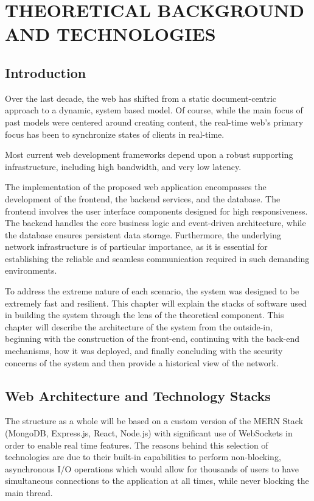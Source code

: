 \chapter{THEORETICAL BACKGROUND AND TECHNOLOGIES}

\section{Introduction}

Over the last decade, the web has shifted from a static document-centric approach to a dynamic, system based model. Of course, while the main focus of past models were centered around creating content, the real-time web's primary focus has been to synchronize states of clients in real-time. 

Most current web development frameworks depend upon a robust supporting infrastructure, including high bandwidth, and very low latency. 

The implementation of the proposed web application encompasses the development of the frontend, the backend services, and the database. The frontend involves the user interface components designed for high responsiveness. The backend handles the core business logic and event-driven architecture, while the database ensures persistent data storage. Furthermore, the underlying network infrastructure is of particular importance, as it is essential for establishing the reliable and seamless communication required in such demanding environments. 

To address the extreme nature of each scenario, the system was designed to be extremely fast and resilient. This chapter will explain the stacks of software used in building the system through the lens of the theoretical component. This chapter will describe the architecture of the system from the outside-in, beginning with the construction of the front-end, continuing with the back-end mechanisms, how it was deployed, and finally concluding with the security concerns of the system and then provide a historical view of the network.

\section{Web Architecture and Technology Stacks}

The structure as a whole will be based on a custom version of the MERN Stack (MongoDB, Express.js, React, Node.js) \cite{banker2011mongodb, express, freeman2019pro, tilkov2010node} with significant use of WebSockets in order to enable real time features. The reasons behind this selection of technologies are due to their built-in capabilities to perform non-blocking, asynchronous I/O operations which would allow for thousands of users to have simultaneous connections to the application at all times, while never blocking the main thread.

